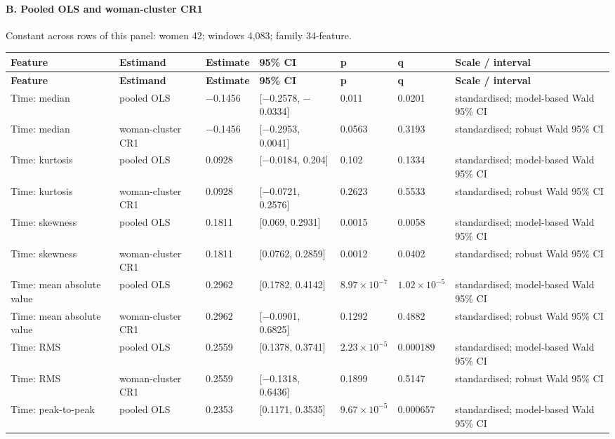 \documentclass[10pt]{article}
\begin{document}
\begin{landscape}
\paragraph{B. Pooled OLS and woman-cluster CR1}
Constant across rows of this panel: women 42; windows 4,083; family 34-feature.
\begin{longtable}{p{4.0cm}p{3.4cm}p{2.0cm}p{3.4cm}p{1.9cm}p{1.9cm}p{5.2cm}}
\toprule
\textbf{Feature} & \textbf{Estimand} & \textbf{Estimate} & \textbf{95\% CI} & \textbf{p} & \textbf{q} & \textbf{Scale / interval} \\
\midrule
\endfirsthead
\toprule
\textbf{Feature} & \textbf{Estimand} & \textbf{Estimate} & \textbf{95\% CI} & \textbf{p} & \textbf{q} & \textbf{Scale / interval} \\
\midrule
\endhead
Time: median & pooled OLS & $-$0.1456 & [$-$0.2578, $-$0.0334] & 0.011 & 0.0201 & standardised; model-based Wald 95\% CI \\
Time: median & woman-cluster CR1 & $-$0.1456 & [$-$0.2953, 0.0041] & 0.0563 & 0.3193 & standardised; robust Wald 95\% CI \\
Time: kurtosis & pooled OLS & 0.0928 & [$-$0.0184, 0.204] & 0.102 & 0.1334 & standardised; model-based Wald 95\% CI \\
Time: kurtosis & woman-cluster CR1 & 0.0928 & [$-$0.0721, 0.2576] & 0.2623 & 0.5533 & standardised; robust Wald 95\% CI \\
Time: skewness & pooled OLS & 0.1811 & [0.069, 0.2931] & 0.0015 & 0.0058 & standardised; model-based Wald 95\% CI \\
Time: skewness & woman-cluster CR1 & 0.1811 & [0.0762, 0.2859] & 0.0012 & 0.0402 & standardised; robust Wald 95\% CI \\
Time: mean absolute value & pooled OLS & 0.2962 & [0.1782, 0.4142] & $8.97\times10^{-7}$ & $1.02\times10^{-5}$ & standardised; model-based Wald 95\% CI \\
Time: mean absolute value & woman-cluster CR1 & 0.2962 & [$-$0.0901, 0.6825] & 0.1292 & 0.4882 & standardised; robust Wald 95\% CI \\
Time: RMS & pooled OLS & 0.2559 & [0.1378, 0.3741] & $2.23\times10^{-5}$ & 0.000189 & standardised; model-based Wald 95\% CI \\
Time: RMS & woman-cluster CR1 & 0.2559 & [$-$0.1318, 0.6436] & 0.1899 & 0.5147 & standardised; robust Wald 95\% CI \\
Time: peak-to-peak & pooled OLS & 0.2353 & [0.1171, 0.3535] & $9.67\times10^{-5}$ & 0.000657 & standardised; model-based Wald 95\% CI \\

\end{longtable}
\end{landscape}
\end{document}
